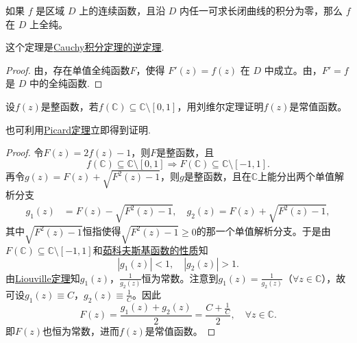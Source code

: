 \documentclass[../../main.tex]{subfiles}%
\begin{document}
\begin{theorem}\label{theorem:Morera定理}
如果 \( f \) 是区域 \( D \) 上的连续函数，且沿 \( D \) 内任一可求长闭曲线的积分为零，那么 \( f \) 在 \( D \) 上全纯。
\end{theorem}
\begin{remark}
这个定理是\hyperref[theorem:Cauchy-Goursat定理(Cauchy积分定理)]{Cauchy积分定理的逆定理}.
\end{remark}
\begin{proof}
由，存在单值全纯函数\( F\)，使得 \( F'(z) = f(z) \) 在 \( D \) 中成立。由，\( F' =f\) 是 \( D \) 中的全纯函数.
\end{proof}

\begin{example}
设$f(z)$是整函数，若$f(\mathbb{C}) \subseteq \mathbb{C} \setminus [0,1]$，用刘维尔定理证明$f(z)$是常值函数。
\end{example}
\begin{note}
也可利用\hyperref[theorem:Picard定理-定理5.2.6]{Picard定理}立即得到证明.
\end{note}
\begin{proof}
令$F(z) = 2f(z) - 1$，则$F$是整函数，且
\[
f(\mathbb{C}) \subseteq \mathbb{C} \setminus [0,1] \Longrightarrow F(\mathbb{C}) \subseteq \mathbb{C} \setminus [-1,1].
\]
再令$g(z) = F(z) + \sqrt{F^2(z) - 1}$，则$g$是整函数，且在$\mathbb{C}$上能分出两个单值解析分支
\begin{align*}
g_1(z) &= F(z) - \sqrt{F^2(z) - 1}, \quad
g_2(z) = F(z) + \sqrt{F^2(z) - 1},
\end{align*}
其中$\sqrt{F^2(z) - 1}$恒指使得$\sqrt{F^2(z) - 1} \geqslant 0$的那一个单值解析分支。于是由$F(\mathbb{C}) \subseteq \mathbb{C} \setminus [-1,1]$和\hyperref[theorem:茹科夫斯基变换的基本性质]{茹科夫斯基函数的性质}知
\[
|g_1(z)| < 1, \quad |g_2(z)| > 1.
\]
由\hyperref[theorem:Liouville(刘维尔)定理]{Liouville定理}知$g_1(z)$，$\frac{1}{g_2(z)}$恒为常数。注意到$g_1(z) = \frac{1}{g_2(z)}$（$\forall z \in \mathbb{C}$），故可设$g_1(z) \equiv C$，$g_2(z) \equiv \frac{1}{C}$。因此
\[
F(z) = \frac{g_1(z) + g_2(z)}{2} = \frac{C + \frac{1}{C}}{2}, \quad \forall z \in \mathbb{C}.
\]
即$F(z)$也恒为常数，进而$f(z)$是常值函数。
\end{proof}
\end{document}
